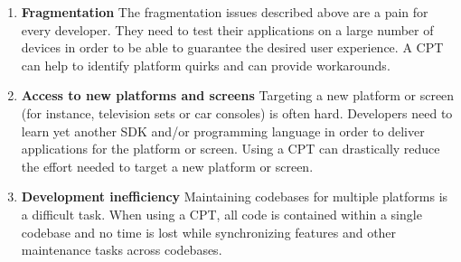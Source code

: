 \begin{enumerate}
    \item \textbf{Fragmentation} The fragmentation issues described above are a pain for every developer. They need to test their applications on a large number of devices in order to be able to guarantee the desired user experience. A CPT can help to identify platform quirks and can provide workarounds. 
    \item \textbf{Access to new platforms and screens} Targeting a new platform or screen (for instance, television sets or car consoles) is often hard. Developers need to learn yet another SDK and/or programming language in order to deliver applications for the platform or screen. Using a CPT can drastically reduce the effort needed to target a new platform or screen.
    \item \textbf{Development inefficiency} Maintaining codebases for multiple platforms is a difficult task. When using a CPT, all code is contained within a single codebase and no time is lost while synchronizing features and other maintenance tasks across codebases. 
\end{enumerate}



